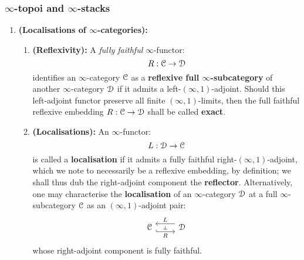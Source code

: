             \subsubsection{\texorpdfstring{$\infty$}{}-topoi and \texorpdfstring{$\infty$}{}-stacks}
                \begin{definition} \label{def: infinity_topoi}
                    \noindent
                    \begin{enumerate}
                        \item \textbf{(Localisations of $\infty$-categories):} 
                            \begin{enumerate}
                                \item \textbf{(Reflexivity):} A \textit{fully faithful} $\infty$-functor:
                                    $$R: \mathcal{C} \to \mathcal{D}$$
                                identifies an $\infty$-category $\mathcal{C}$ as a \textbf{reflexive full $\infty$-subcategory} of another $\infty$-category $\mathcal{D}$ if it admits a left-$(\infty, 1)$-adjoint. Should this left-adjoint functor preserve all finite $(\infty, 1)$-limits, then the full faithful reflexive embedding $R: \mathcal{C} \to \mathcal{D}$ shall be called \textbf{exact}.
                                \item \textbf{(Localisations):} An $\infty$-functor:
                                    $$L: \mathcal{D} \to \mathcal{C}$$
                                is called a \textbf{localisation} if it admits a fully faithful right-$(\infty, 1)$-adjoint, which we note to necessarily be a reflexive embedding, by definition; we shall thus dub the right-adjoint component the \textbf{reflector}. Alternatively, one may characterise the \textbf{localisation} of an $\infty$-category $\mathcal{D}$ at a full $\infty$-subcategory $\mathcal{C}$ as an $(\infty, 1)$-adjoint pair:
                                    $$
                                        \begin{tikzcd}
                                        	\C & \D
                                        	\arrow[""{name=0, anchor=center, inner sep=0}, "L"', shift right=2, from=1-2, to=1-1]
                                        	\arrow[""{name=1, anchor=center, inner sep=0}, "R"', shift right=2, hook, from=1-1, to=1-2]
                                        	\arrow["\dashv"{anchor=center, rotate=-90}, draw=none, from=0, to=1]
                                        \end{tikzcd}
                                    $$
                                whose right-adjoint component is fully faithful. 
                                

\end{enumerate}
\end{enumerate}
\end{definition}
